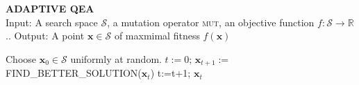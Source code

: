 \documentclass{article}
\begin{document}
\begin{algorithm}
{\bf ADAPTIVE QEA}\\
Input: A search space $\mathcal{S}$, a mutation operator \textsc{mut}, an objective function $f:\mathcal{S}\to\mathbb{R}$..
Output: A point $\mathbf{x} \in \mathcal{S}$ of maxmimal fitness $f(\mathbf{x})$
\begin{algorithmic}
\STATE Choose $\mathbf{x}_0 \in \mathcal{S}$ uniformly at random.
\STATE $t:=0$;
\STATE $\mathbf{x}_{t+1} :=$ FIND\_BETTER\_SOLUTION($\mathbf{x}_{t}$)
\STATE t:=t+1;
\ENDWHILE
\RETURN $\mathbf{x}_t$
\end{algorithmic}
\end{algorithm}
\end{document}
